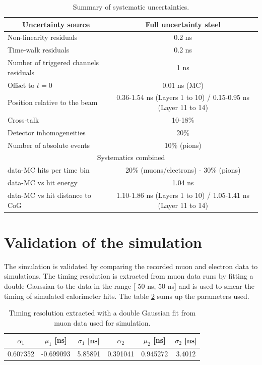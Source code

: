 {
\renewcommand{\arraystretch}{1.2}
\begin{table}[htb!]
	\centering
	\caption{Summary of systematic uncertainties.}
	\label{table:time_syst}
	\begin{tabular}{@{} lc @{}}
		\toprule
		\multicolumn{1}{c}{Uncertainty source} & Full uncertainty steel \\
		\midrule
		Non-linearity residuals & 0.2 ns \\
		Time-walk residuals & 0.2 ns \\
		Number of triggered channels residuals & 1 ns \\
		Offset to $t=0$ & 0.01 ns (MC) \\
		Position relative to the beam & 0.36-1.54 ns (Layers 1 to 10) / 0.15-0.95 ns (Layer 11 to 14) \\
		Cross-talk & 10-18\% \\
		Detector inhomogeneities & 20\% \\
		Number of absolute events & 10\% (pions) \\
		\midrule
		\midrule
		\multicolumn{2}{c}{Systematics combined} \\
		\midrule
		data-MC hits per time bin & 20\% (muons/electrons) - 30\% (pions) \\
		data-MC vs hit energy & 1.04 ns \\
		data-MC vs hit distance to CoG & 1.10-1.86 ns (Layers 1 to 10) / 1.05-1.41 ns (Layer 11 to 14) \\
		\bottomrule
	\end{tabular}
\end{table}
}

\section{Validation of the simulation}

The simulation is validated by comparing the recorded muon and electron data to simulations. The timing resolution is extracted from muon data runs by fitting a double Gaussian to the data in the range [-50 ns, 50 ns] and is used to smear the timing of simulated calorimeter hits. The table \ref{table:time_res_sim} sums up the parameters used.

\begin{table}[htb!]
	\centering
	\caption{Timing resolution extracted with a double Gaussian fit from muon data used for simulation.}
	\label{table:time_res_sim}
	\begin{tabular}{@{} cccccc @{}}
		\hline
		$\alpha_{1}$ & $\mu_{1}$ [ns] & $\sigma_{1}$ [ns] & $\alpha_{2}$ & $\mu_{2}$ [ns] & $\sigma_{2}$ [ns] \\
		\hline
		0.607352 & -0.699093 & 5.85891 & 0.391041 & 0.945272 & 3.4012 \\
		\hline
	\end{tabular}
\end{table}

